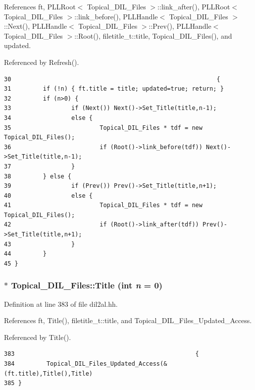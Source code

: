 References ft, PLLRoot$<$ Topical\_\-DIL\_\-Files $>$::link\_\-after(), PLLRoot$<$ Topical\_\-DIL\_\-Files $>$::link\_\-before(), PLLHandle$<$ Topical\_\-DIL\_\-Files $>$::Next(), PLLHandle$<$ Topical\_\-DIL\_\-Files $>$::Prev(), PLLHandle$<$ Topical\_\-DIL\_\-Files $>$::Root(), filetitle\_\-t::title, Topical\_\-DIL\_\-Files(), and updated.

Referenced by Refresh().



\footnotesize\begin{verbatim}30                                                          {
31         if (!n) { ft.title = title; updated=true; return; }
32         if (n>0) {
33                 if (Next()) Next()->Set_Title(title,n-1);
34                 else {
35                         Topical_DIL_Files * tdf = new Topical_DIL_Files();
36                         if (Root()->link_before(tdf)) Next()->Set_Title(title,n-1);
37                 }
38         } else {
39                 if (Prev()) Prev()->Set_Title(title,n+1);
40                 else {
41                         Topical_DIL_Files * tdf = new Topical_DIL_Files();
42                         if (Root()->link_after(tdf)) Prev()->Set_Title(title,n+1);
43                 }
44         }
45 }
\end{verbatim}\normalsize 
{}
\subsubsection{ $\ast$ Topical\_\-DIL\_\-Files::Title (int {\em n} = 0)\hspace{0.3cm}{\tt  [inline]}}\label{classTopical__DIL__Files_a4}




Definition at line 383 of file dil2al.hh.

References ft, Title(), filetitle\_\-t::title, and Topical\_\-DIL\_\-Files\_\-Updated\_\-Access.

Referenced by Title().



\footnotesize\begin{verbatim}383                                                   {
384         Topical_DIL_Files_Updated_Access(&(ft.title),Title(),Title)
385 }
\end{verbatim}\normalsize 
{}

